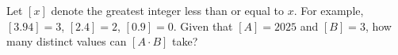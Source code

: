 Let $[x]$ denote the greatest integer less than or equal to $x$. For example, $[3.94]=3$, $[2.4]=2$, $[0.9]=0$. Given that $[A]=2025$ and $[B]=3$, how many distinct values can $[A \cdot B]$ take?
